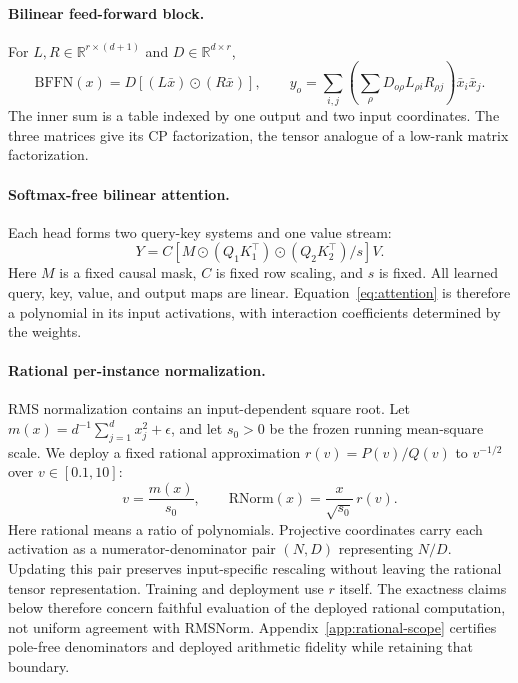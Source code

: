 \documentclass{article}
\newcommand{\R}{\mathbb{R}}
\begin{document}
\paragraph{Bilinear feed-forward block.}
For $L,R\in\R^{r\times(d+1)}$ and $D\in\R^{d\times r}$,
\begin{equation}
\mathrm{BFFN}(x)
=D\left[(L\bar x)\odot(R\bar x)\right],
\qquad
y_o=\sum_{i,j}\left(\sum_{\rho}D_{o\rho}L_{\rho i}R_{\rho j}\right)\bar x_i\bar x_j .
\label{eq:bffn}
\end{equation}
The inner sum is a table indexed by one output and two input coordinates. The three matrices
give its CP factorization, the tensor analogue of a low-rank matrix factorization.

\paragraph{Softmax-free bilinear attention.}
Each head forms two query-key systems and one value stream:
\begin{equation}
Y=C\left[M\odot(Q_1K_1^\top)\odot(Q_2K_2^\top)/s\right]V .
\label{eq:attention}
\end{equation}
Here $M$ is a fixed causal mask, $C$ is fixed row scaling, and $s$ is fixed. All learned
query, key, value, and output maps are linear. Equation~\ref{eq:attention} is therefore a
polynomial in its input activations, with interaction coefficients determined by the weights.

\paragraph{Rational per-instance normalization.}
RMS normalization contains an input-dependent square root. Let
$m(x)=d^{-1}\sum_{j=1}^{d}x_j^2+\epsilon$, and let $s_0>0$ be the frozen running mean-square
scale. We deploy a fixed rational approximation $r(v)=P(v)/Q(v)$ to $v^{-1/2}$ over
$v\in[0.1,10]$:
\begin{equation}
v=\frac{m(x)}{s_0}, \qquad
\mathrm{RNorm}(x)=\frac{x}{\sqrt{s_0}}\,r(v).
\label{eq:rnorm}
\end{equation}
Here rational means a ratio of polynomials. Projective coordinates carry each activation as a
numerator-denominator pair $(N,D)$ representing $N/D$. Updating this pair preserves
input-specific rescaling without leaving the rational tensor representation.
Training and deployment use $r$ itself. The exactness claims below therefore concern faithful
evaluation of the deployed rational computation, not uniform agreement with RMSNorm.
Appendix~\ref{app:rational-scope} certifies pole-free denominators and deployed arithmetic
fidelity while retaining that boundary.
\end{document}
